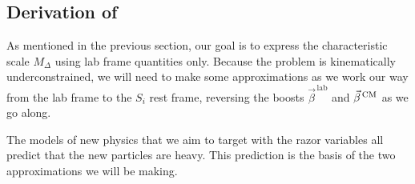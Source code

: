 \subsection{Derivation of \texorpdfstring{\mr}{MR} \label{sec:razor_mr}}

As mentioned in the previous section, our goal is to express the characteristic scale $M_\Delta$
using lab frame quantities only. Because the problem is kinematically underconstrained, we will
need to make some approximations as we work our way from the lab frame to the $S_i$ rest frame,
reversing the boosts $\vec{\beta}^{\,\textrm{lab}}$ and $\vec{\beta}^{\,\textrm{CM}}$ as we go along. 

The models of new physics that we aim to target with the razor variables all predict that the new
particles are heavy. This prediction is the basis of the two approximations we will be making. 

